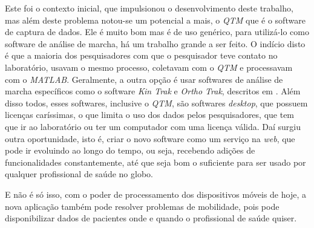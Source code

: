 Este foi o contexto inicial, que impulsionou o desenvolvimento deste trabalho,
mas além deste problema notou-se um potencial a mais, o \emph{QTM} que é o software 
de captura de dados. Ele é muito bom mas é de uso genérico, para utilizá-lo como 
software de análise de marcha, há um trabalho grande a ser feito. O indício disto é 
que a maioria dos pesquisadores com que o pesquisador teve contato no laboratório, 
usavam o mesmo processo, coletavam com o \emph{QTM} e processavam com o \emph{MATLAB}. 
Geralmente, a outra opção é usar softwares de análise de marcha específicos como 
o software \emph{Kin Trak} e \emph{Ortho Trak}, descritos em . Além disso todos, esses softwares, inclusive o
\emph{QTM}, são softwares \emph{desktop}, que possuem licenças caríssimas, o que limita o
uso dos dados pelos pesquisadores, que tem que ir ao laboratório ou ter um computador
com uma licença válida. Daí surgiu outra oportunidade, isto é, criar o novo software 
como um serviço na \emph{web}, que pode ir evoluindo ao longo do tempo, ou seja,
recebendo adições de funcionalidades constantemente, até que seja bom o suficiente
para ser usado por qualquer profissional de saúde no globo.

E não é só isso, com o poder de processamento dos dispositivos móveis de hoje, a nova
aplicação também pode resolver problemas de mobilidade, pois pode disponibilizar dados de pacientes
onde e quando o profissional de saúde quiser.


